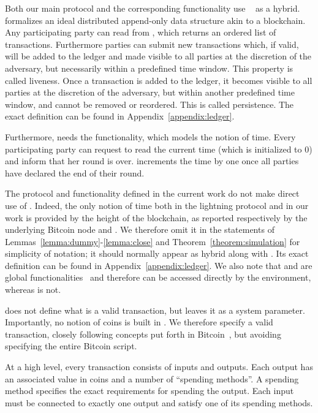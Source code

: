     Both our main protocol and the corresponding functionality use
    \ledger~\cite{BMTZ17,genesis} as a hybrid. \ledger{} formalizes an ideal
    distributed append-only data structure akin to a blockchain. Any
    participating party can read from \ledger, which returns an ordered list
    of transactions. Furthermore parties can submit new transactions which, if
    valid, will be added to the ledger and made visible to all parties at the
    discretion of the adversary, but necessarily within a predefined time
    window. This property is called liveness. Once a transaction is added to the
    ledger, it becomes visible to all parties at the discretion of the
    adversary, but within another predefined time window, and cannot be removed
    or reordered. This is called persistence. The exact definition can be found
    in Appendix~\ref{appendix:ledger}.

    Furthermore, \ledger{} needs the \Fclock functionality, which models the
    notion of time. Every participating party can request to read the current
    time (which is initialized to 0) and inform \Fclock that her round is over.
    \Fclock increments the time by one once all parties have declared the end of
    their round.

    The protocol and functionality defined in the current work do not make
    direct use of \Fclock. Indeed, the only notion of time both in the lightning
    protocol and in our work is provided by the height of the blockchain, as
    reported respectively by the underlying Bitcoin node and \ledger. We
    therefore omit it in the statements of
    Lemmas~\ref{lemma:dummy}-\ref{lemma:close} and
    Theorem~\ref{theorem:simulation} for simplicity of notation; it should
    normally appear as hybrid along with \ledger. Its exact definition can be
    found in Appendix~\ref{appendix:ledger}. We also note that \ledger{} and
    \Fclock are global functionalities~\cite{globaluc} and therefore can be
    accessed directly by the environment, whereas \fpaynet{} is not.

    \ledger{} does not define what is a valid transaction, but leaves it as a
    system parameter. Importantly, no notion of coins is built in \ledger. We
    therefore specify a valid transaction, closely following concepts put forth
    in Bitcoin~\cite{bitcoin}, but avoiding specifying the entire Bitcoin
    script.

    At a high level, every transaction consists of inputs and outputs. Each
    output has an associated value in coins and a number of ``spending
    methods''. A spending method specifies the exact requirements for spending
    the output. Each input must be connected to exactly one output and satisfy
    one of its spending methods.

